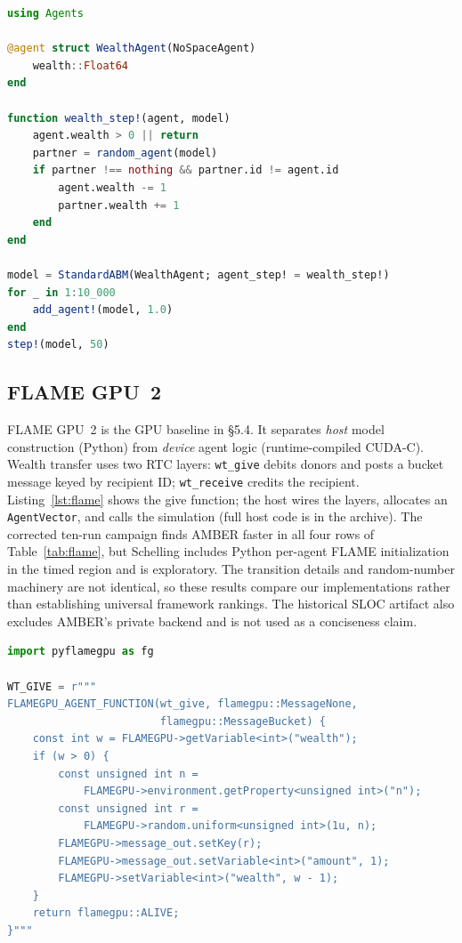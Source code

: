 \documentclass[sigconf,nonacm,review,natbib=true]{acmart}
\newcommand{\appendixbreak}{%
  \FloatBarrier
}
\theoremstyle{definition}
\theoremstyle{plain}
\theoremstyle{remark}
\begin{document}
\begin{lstlisting}[style=applisting,language=Julia,caption={Agents.jl wealth transfer.},label={lst:agentsjl}]
using Agents

@agent struct WealthAgent(NoSpaceAgent)
    wealth::Float64
end

function wealth_step!(agent, model)
    agent.wealth > 0 || return
    partner = random_agent(model)
    if partner !== nothing && partner.id != agent.id
        agent.wealth -= 1
        partner.wealth += 1
    end
end

model = StandardABM(WealthAgent; agent_step! = wealth_step!)
for _ in 1:10_000
    add_agent!(model, 1.0)
end
step!(model, 50)
\end{lstlisting}

\appendixbreak
\subsection{FLAME GPU~2}
\label{app:usage:flame}

FLAME GPU~2 \citep{richmond2023} is the GPU baseline in \S5.4. It separates
\emph{host} model construction (Python) from \emph{device} agent logic
(runtime-compiled CUDA-C). Wealth transfer uses two RTC layers:
\texttt{wt\_give} debits donors and posts a bucket message keyed by recipient
ID; \texttt{wt\_receive} credits the recipient. Listing~\ref{lst:flame} shows
the give function; the host wires the layers, allocates an
\texttt{AgentVector}, and calls the simulation (full host code is in the
archive). The corrected ten-run campaign finds AMBER faster in all four rows of
Table~\ref{tab:flame}, but Schelling includes Python per-agent FLAME
initialization in the timed region and is exploratory. The transition details
and random-number machinery are not identical, so these results compare our
implementations rather than establishing universal framework rankings. The historical SLOC artifact also
excludes AMBER's private backend and is not used as a conciseness claim.
\begin{lstlisting}[style=applisting,language=Python,caption={FLAME GPU~2 --- RTC give layer (wealth transfer).},label={lst:flame}]
import pyflamegpu as fg

WT_GIVE = r"""
FLAMEGPU_AGENT_FUNCTION(wt_give, flamegpu::MessageNone,
                        flamegpu::MessageBucket) {
    const int w = FLAMEGPU->getVariable<int>("wealth");
    if (w > 0) {
        const unsigned int n =
            FLAMEGPU->environment.getProperty<unsigned int>("n");
        const unsigned int r =
            FLAMEGPU->random.uniform<unsigned int>(1u, n);
        FLAMEGPU->message_out.setKey(r);
        FLAMEGPU->message_out.setVariable<int>("amount", 1);
        FLAMEGPU->setVariable<int>("wealth", w - 1);
    }
    return flamegpu::ALIVE;
}"""
\end{lstlisting}
\end{document}
